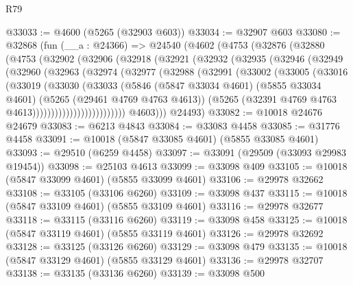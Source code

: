 \begin{lexlean}{R79}
\begin{coremodule}
@33033 := @4600 (@5265 (@32903 @603))
@33034 := @32907 @603
@33080 := @32868
    (fun (__a : @24366) =>
    @24540
      (@4602
        (@4753
          (@32876
            (@32880
              (@4753
                (@32902
                  (@32906
                    (@32918
                      (@32921
                        (@32932
                          (@32935
                            (@32946
                              (@32949
                                (@32960
                                  (@32963
                                    (@32974
                                      (@32977
                                        (@32988
                                          (@32991
                                            (@33002
                                              (@33005
                                                (@33016
                                                  (@33019
                                                    (@33030
                                                      (@33033
                                                        (@5846
                                                          (@5847 @33034 @4601)
                                                          (@5855 @33034 @4601)
                                                          (@5265 (@29461 @4769 @4763 @4613))
                                                          (@5265
                                                            (@32391
                                                              @4769
                                                              @4763
                                                              @4613)))))))))))))))))))))))))
            @4603)))
      @24493)
@33082 := @10018 @24676 @24679
@33083 := @6213 @4843
@33084 := @33083 @4458
@33085 := @31776 @4458
@33091 := @10018 (@5847 @33085 @4601) (@5855 @33085 @4601)
@33093 := @29510 (@6259 @4458)
@33097 := @33091 (@29509 (@33093 @29983 @19454))
@33098 := @25103 @4613
@33099 := @33098 @409
@33105 := @10018 (@5847 @33099 @4601) (@5855 @33099 @4601)
@33106 := @29978 @32662
@33108 := @33105 (@33106 @6260)
@33109 := @33098 @437
@33115 := @10018 (@5847 @33109 @4601) (@5855 @33109 @4601)
@33116 := @29978 @32677
@33118 := @33115 (@33116 @6260)
@33119 := @33098 @458
@33125 := @10018 (@5847 @33119 @4601) (@5855 @33119 @4601)
@33126 := @29978 @32692
@33128 := @33125 (@33126 @6260)
@33129 := @33098 @479
@33135 := @10018 (@5847 @33129 @4601) (@5855 @33129 @4601)
@33136 := @29978 @32707
@33138 := @33135 (@33136 @6260)
@33139 := @33098 @500

\end{coremodule}
\end{lexlean}

